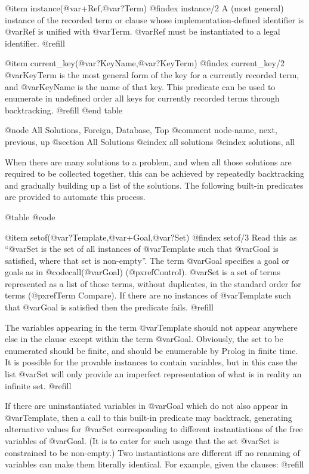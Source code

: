 @item instance(@var{+Ref},@var{?Term})
@findex instance/2
A (most general) instance of the recorded term or clause whose
implementation-defined identifier is @var{Ref} is unified with @var{Term}.
@var{Ref} must be instantiated to a legal identifier. @refill

@item current_key(@var{?KeyName},@var{?KeyTerm})
@findex current_key/2
@var{KeyTerm} is the most general form of the key for a currently
recorded term, and @var{KeyName} is the name of that key.  This
predicate can be used to enumerate in undefined order all keys for
currently recorded terms through backtracking. @refill
@end table

@node All Solutions, Foreign, Database, Top
@comment  node-name,  next,  previous,  up
@section All Solutions
@cindex all solutions
@cindex solutions, all

When there are many solutions to a problem, and when all those solutions
are required to be collected together, this can be achieved by repeatedly
backtracking and gradually building up a list of the solutions.  The
following built-in predicates are provided to automate this process.

@table @code

@item setof(@var{?Template},@var{+Goal},@var{?Set})
@findex setof/3
Read this as ``@var{Set} is the set of all instances of @var{Template}
such that @var{Goal} is satisfied, where that set is non-empty''.  The
term @var{Goal} specifies a goal or goals as in @code{call(@var{Goal})}
(@pxref{Control}).  @var{Set} is a set of terms represented as a list of
those terms, without duplicates, in the standard order for terms
(@pxref{Term Compare}).  If there are no instances of @var{Template}
such that @var{Goal} is satisfied then the predicate fails. @refill

The variables appearing in the term @var{Template} should not appear
anywhere else in the clause except within the term @var{Goal}.  Obviously,
the set to be enumerated should be finite, and should be enumerable by
Prolog in finite time.  It is possible for the provable instances to
contain variables, but in this case the list @var{Set} will only provide an
imperfect representation of what is in reality an infinite set. @refill

If there are uninstantiated variables in @var{Goal} which do not also
appear in @var{Template}, then a call to this built-in predicate may
backtrack, generating alternative values for @var{Set} corresponding to
different instantiations of the free variables of @var{Goal}.  (It is to
cater for such usage that the set @var{Set} is constrained to be
non-empty.)  Two instantiations are different iff no renaming of
variables can make them literally identical.  For example, given the
clauses: @refill

